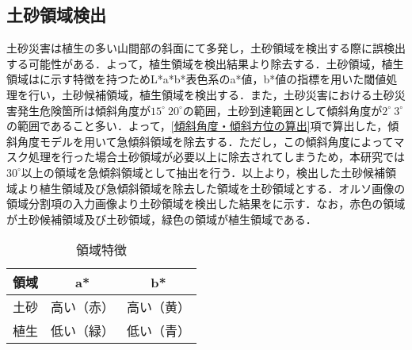     \subsection{土砂領域検出}
      \label{土砂領域検出}
      土砂災害は植生の多い山間部の斜面にて多発し，土砂領域を検出する際に誤検出する可能性がある．よって，植生領域を検出結果より除去する．土砂領域，植生領域はに示す特徴を持つためL*a*b*表色系のa*値，b*値の指標を用いた閾値処理を行い，土砂候補領域，植生領域を検出する．また，土砂災害における土砂災害発生危険箇所は傾斜角度が$15^{\circ}~20^{\circ}$の範囲，土砂到達範囲として傾斜角度が$2^{\circ}~3^{\circ}$の範囲であること多い\cite{土砂災害発生範囲}．よって，\ref{傾斜角度・傾斜方位の算出}項で算出した，傾斜角度モデルを用いて急傾斜領域を除去する．ただし，この傾斜角度によってマスク処理を行った場合土砂領域が必要以上に除去されてしまうため，本研究では$30^{\circ}$以上の領域を急傾斜領域として抽出を行う．以上より，検出した土砂候補領域より植生領域及び急傾斜領域を除去した領域を土砂領域とする．{オルソ画像の領域分割}項の入力画像より土砂領域を検出した結果をに示す．なお，赤色の領域が土砂候補領域及び土砂領域，緑色の領域が植生領域である．

      \begin{table}[b]
        \centering
        \caption{領域特徴}
        \label{領域特徴}
        \begin{tabular}{ccc}
          \hline
          \textbf{領域} & \textbf{a*} & \textbf{b*} \\
          \hline  \hline
          土砂 & 高い（赤） & 高い（黄） \\
          植生 & 低い（緑） & 低い（青） \\ \hline
        \end{tabular}
      \end{table}
      
